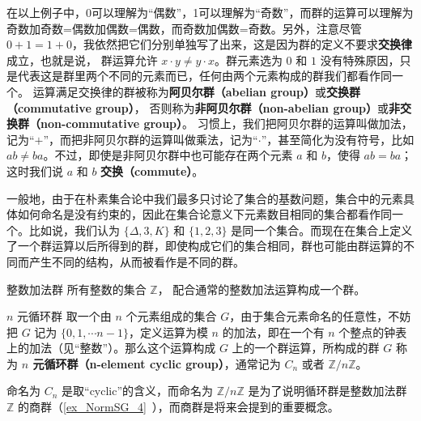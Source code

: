 在以上例子中，0可以理解为“偶数”，1可以理解为“奇数”，而群的运算可以理解为奇数加奇数=偶数加偶数=偶数，而奇数加偶数=奇数。另外，注意尽管 $0+1=1+0$，我依然把它们分别单独写了出来，这是因为群的定义不要求\textbf{交换律}成立，也就是说， 群运算允许 $x\cdot y\neq y\cdot x$。群元素选为 $0$ 和 $1$ 没有特殊原因，只是代表这是群里两个不同的元素而已，任何由两个元素构成的群我们都看作同一个。 运算满足交换律的群被称为\textbf{阿贝尔群（abelian group）}或\textbf{交换群（commutative group）}， 否则称为\textbf{非阿贝尔群（non-abelian group）}或\textbf{非交换群（non-commutative group）}。 习惯上，我们把阿贝尔群的运算叫做加法，记为“$+$”，而把非阿贝尔群的运算叫做乘法，记为“$\cdot$”，甚至简化为没有符号，比如 $ab\not= ba$。不过，即使是非阿贝尔群中也可能存在两个元素 $a$ 和 $b$，使得 $ab=ba$；这时我们说 $a$ 和 $b$ \textbf{交换（commute）}。

一般地，由于在朴素集合论中我们最多只讨论了集合的基数问题，集合中的元素具体如何命名是没有约束的，因此在集合论意义下元素数目相同的集合都看作同一个。比如说，我们认为 $\{\Delta,3, K\}$ 和 $\{1,2,3\}
$ 是同一个集合。而现在在集合上定义了一个群运算以后所得到的群，即使构成它们的集合相同，群也可能由群运算的不同而产生不同的结构，从而被看作是不同的群。

\begin{example}{整数加法群}\label{ex_Group_1}
所有整数的集合 $\mathbb Z$， 配合通常的整数加法运算构成一个群。
\end{example}

\begin{example}{$n$ 元循环群}\label{ex_Group_2}
取一个由 $n$ 个元素组成的集合 $G$，由于集合元素命名的任意性，不妨把 $G$ 记为 $\{0, 1, \cdots n-1\}$，定义运算为模 $n$ 的加法，即在一个有 $n$ 个整点的钟表上的加法（见“整数”）。那么这个运算构成 $G$ 上的一个群运算，所构成的群 $G$ 称为 \textbf{$n$ 元\textbf{循环群（n-element cyclic group）}}，通常记为 $C_n$ 或者 $\mathbb{Z}/n\mathbb{Z}$。

命名为 $C_n$ 是取“cyclic”的含义，而命名为 $\mathbb{Z}/n\mathbb{Z}$ 是为了说明循环群是整数加法群 $\mathbb{Z}$ 的商群（\autoref{ex_NormSG_4}~），而商群是将来会提到的重要概念。
\end{example}

